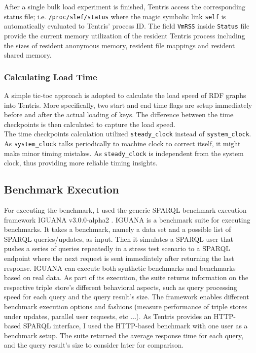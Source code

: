 After a single bulk load experiment is finished, Tentris access the corresponding status file; i.e. \verb|/proc/slef/status| where the magic symbolic link \verb|self| is automatically evaluated to Tentris' process ID. The field \verb|VmRSS| inside \verb|Status| file provide the current memory utilization of the resident Tentris process including the sizes of resident anonymous memory, resident file mappings and resident shared memory. 

\subsubsection{Calculating Load Time}
A simple tic-toc approach is adopted to calculate the load speed of RDF graphs into Tentris. More specifically, two start and end time flags are setup immediately before and after the actual loading of keys. The difference between the time checkpoints is then calculated to capture the load speed.  \\

The time checkpoints calculation utilized \verb|steady_clock| instead of \verb|system_clock|.
As \verb|system_clock| talks periodically to machine clock to correct itself, it might make minor timing mistakes. As \verb|steady_clock| is independent from the system clock, thus providing more reliable timing insights. 
 
\subsection{Benchmark Execution}
For executing the benchmark, I used the generic SPARQL benchmark execution framework IGUANA v3.0.0-alpha2 \cite{conrads-2017-iguana-demo}. 
IGUANA is a benchmark suite for executing benchmarks. 
It takes a benchmark, namely a data set and a possible list of SPARQL queries/updates, as input. 
Then it simulates a SPARQL user that pushes a series of queries repeatedly in a stress test scenario to a SPARQL endpoint where the next request is sent immediately after returning the last response. 
IGUANA can execute both synthetic benchmarks and benchmarks based on real data.
As part of its execution, the suite returns information on the respective triple store's different behavioral aspects, such as query processing speed for each query and the query result's size. 
The framework enables different benchmark execution options and fashions (measure performance of triple stores under updates, parallel user requests, etc ...). 
As Tentris provides an HTTP-based SPARQL interface, I used the HTTP-based benchmark with one user as a benchmark setup. 
The suite returned the average response time for each query, and the query result's size to consider later for comparison.  \\

